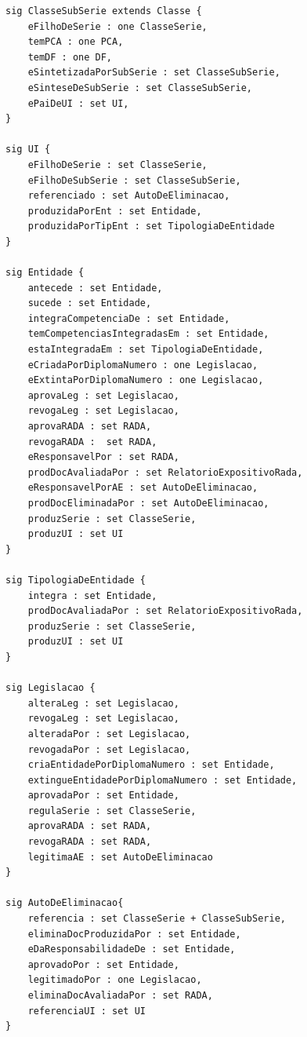 \documentclass{article}
\begin{document}
\begin{lstlisting}[language=alloy, frame=single]
sig ClasseSubSerie extends Classe {
	eFilhoDeSerie : one ClasseSerie,
	temPCA : one PCA,
	temDF : one DF,
	eSintetizadaPorSubSerie : set ClasseSubSerie,
	eSinteseDeSubSerie : set ClasseSubSerie,
	ePaiDeUI : set UI,
}

sig UI {
	eFilhoDeSerie : set ClasseSerie,
	eFilhoDeSubSerie : set ClasseSubSerie,
	referenciado : set AutoDeEliminacao,
	produzidaPorEnt : set Entidade,
	produzidaPorTipEnt : set TipologiaDeEntidade
}

sig Entidade {
	antecede : set Entidade,
	sucede : set Entidade,
	integraCompetenciaDe : set Entidade,
	temCompetenciasIntegradasEm : set Entidade,
	estaIntegradaEm : set TipologiaDeEntidade,
	eCriadaPorDiplomaNumero : one Legislacao,
	eExtintaPorDiplomaNumero : one Legislacao,
	aprovaLeg : set Legislacao,
	revogaLeg : set Legislacao,
	aprovaRADA : set RADA,
	revogaRADA :  set RADA,
	eResponsavelPor : set RADA,
	prodDocAvaliadaPor : set RelatorioExpositivoRada,
	eResponsavelPorAE : set AutoDeEliminacao,
	prodDocEliminadaPor : set AutoDeEliminacao,
	produzSerie : set ClasseSerie,
	produzUI : set UI
}

sig TipologiaDeEntidade {
	integra : set Entidade,
	prodDocAvaliadaPor : set RelatorioExpositivoRada,
	produzSerie : set ClasseSerie,
	produzUI : set UI
}

sig Legislacao {
	alteraLeg : set Legislacao,
	revogaLeg : set Legislacao,
	alteradaPor : set Legislacao,
	revogadaPor : set Legislacao,
	criaEntidadePorDiplomaNumero : set Entidade,
	extingueEntidadePorDiplomaNumero : set Entidade,
	aprovadaPor : set Entidade,
	regulaSerie : set ClasseSerie,
	aprovaRADA : set RADA,
	revogaRADA : set RADA,
	legitimaAE : set AutoDeEliminacao
}

sig AutoDeEliminacao{
	referencia : set ClasseSerie + ClasseSubSerie, 
	eliminaDocProduzidaPor : set Entidade,
	eDaResponsabilidadeDe : set Entidade,
	aprovadoPor : set Entidade,
	legitimadoPor : one Legislacao,
	eliminaDocAvaliadaPor : set RADA,
	referenciaUI : set UI
}


\end{lstlisting}
\end{document}
